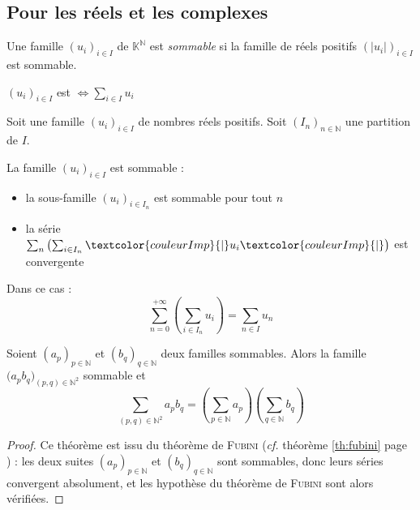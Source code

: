 \documentclass[11pt,a4paper,fleqn,pdftex]{report}
\begin{document}
\subsection{Pour les réels et les complexes} %
\label{sub:famille_sommable_complexe_reel}
\begin{dfn}
     Une famille $(u_i)_{i\in I}$ de $\mathbb{K}^\mathbb{N}$ est \emph{sommable} si la famille de réels positifs $(|u_i|)_{i\in I}$ est sommable.
\end{dfn}
\begin{theorem}
     $(u_i)_{i\in I}$ est  $\Leftrightarrow \sum_{i\in I} u_i$ 
\end{theorem}
\begin{itheorem}
     Soit une famille $(u_i)_{i\in I}$ de nombres réels positifs.\newline
     Soit $(I_n)_{n\in\mathbb{N}}$ une partition  de $I$.\par
     La famille $(u_i)_{i\in I}$ est sommable  :
     \begin{itemize}
         \item la sous-famille $(u_i)_{i\in I_n}$ est sommable pour tout $n$
         \item la série $\sum_n \left( \sum_{i\in I_n} \textcolor{couleurImp}{|}u_i \textcolor{couleurImp}{|} \right)$ est convergente
     \end{itemize}
     Dans ce cas : 
     \begin{equation}
     \sum_{n=0}^{+\infty} \left( \sum_{i\in I_n} u_i \right) = \sum_{n\in I} u_n
     \end{equation}
\end{itheorem}
\begin{theorem}
     Soient $(a_p)_{p\in \mathbb{N}}$ et $(b_q)_{q\in \mathbb{N}}$ deux familles sommables. Alors la famille $\big( a_p b_q\big)_{(p,q)\in \mathbb{N}^2}$ sommable et 
     \begin{equation}
     \sum_{(p,q)\in \mathbb{N}^2} a_p b_q= \left( \sum_{p\in \mathbb{N}} a_p \right) \left( \sum_{q\in \mathbb{N}} b_q \right)
     \end{equation}
\end{theorem}
\begin{proof}
     Ce théorème est issu du théorème de \textsc{Fubini} (\textit{cf.} théorème \ref{th:fubini} page \pageref{th:fubini}) : les deux suites $(a_p)_{p\in \mathbb{N}}$ et $(b_q)_{q\in \mathbb{N}}$ sont sommables, donc leurs séries convergent absolument, et les hypothèse du théorème de \textsc{Fubini} sont alors vérifiées.
\end{proof}
\end{document}

